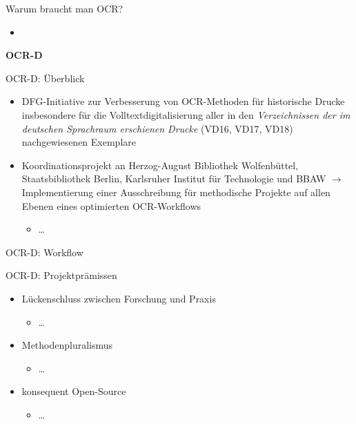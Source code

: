 \documentclass{bbawslides}
\begin{document}
\begin{bbawslide}{Warum braucht man OCR?}
  \vspace*{7mm}%
  \centerslidestrue%
  \begin{itemize}
    \item
  \end{itemize}
\end{bbawslide}

\begin{bbawpart}{\Large\bf OCR-D}
\end{bbawpart}

\begin{bbawslide}{OCR-D: Überblick}
  \vspace*{7mm}%
  \centerslidestrue%
  \begin{itemize}
    \item DFG-Initiative zur Verbesserung von OCR-Methoden für historische Drucke insbesondere
          für die Volltextdigitalisierung aller in den \emph{Verzeichnissen der im deutschen
          Sprachraum erschienen Drucke} (VD16, VD17, VD18) nachgewiesenen Exemplare
    \item Koordinationsprojekt an Herzog-August Bibliothek Wolfenbüttel, Staatsbibliothek
          Berlin, Karlsruher Institut für Technologie und BBAW $\rightarrow$ Implementierung
          einer Ausschreibung für methodische
          Projekte auf allen Ebenen eines optimierten OCR-Workflows
    \begin{itemize}\small
      \item \ldots
    \end{itemize}
  \end{itemize}
\end{bbawslide}

\begin{bbawslide}{OCR-D: Workflow}
\end{bbawslide}

\begin{bbawslide}{OCR-D: Projektprämissen}
  \vspace*{7mm}%
  \centerslidestrue%
  \begin{itemize}
    \item Lückenschluss zwischen Forschung und Praxis
    \begin{itemize}\small
      \item \ldots
    \end{itemize}
    \item Methodenpluralismus
    \begin{itemize}\small
      \item \ldots
    \end{itemize}
    \item konsequent Open-Source
    \begin{itemize}\small
      \item \ldots
    \end{itemize}
  \end{itemize}
\end{bbawslide}
\end{document}
